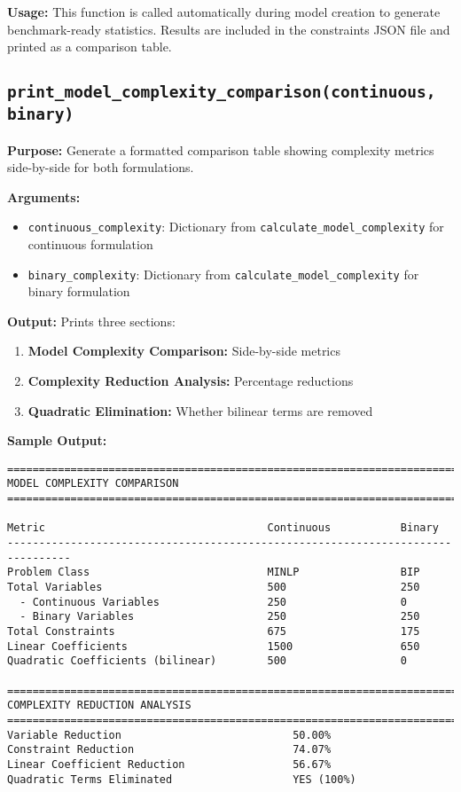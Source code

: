 \documentclass{article}
\begin{document}
\textbf{Usage:} This function is called automatically during model creation to generate benchmark-ready statistics. Results are included in the constraints JSON file and printed as a comparison table.

\subsection{\texttt{print\_model\_complexity\_comparison(continuous, binary)}}

\textbf{Purpose:} Generate a formatted comparison table showing complexity metrics side-by-side for both formulations.

\textbf{Arguments:}
\begin{itemize}
    \item \texttt{continuous\_complexity}: Dictionary from \texttt{calculate\_model\_complexity} for continuous formulation
    \item \texttt{binary\_complexity}: Dictionary from \texttt{calculate\_model\_complexity} for binary formulation
\end{itemize}

\textbf{Output:} Prints three sections:
\begin{enumerate}
    \item \textbf{Model Complexity Comparison:} Side-by-side metrics
    \item \textbf{Complexity Reduction Analysis:} Percentage reductions
    \item \textbf{Quadratic Elimination:} Whether bilinear terms are removed
\end{enumerate}

\textbf{Sample Output:}
\begin{verbatim}
================================================================================
MODEL COMPLEXITY COMPARISON
================================================================================

Metric                                   Continuous           Binary              
--------------------------------------------------------------------------------
Problem Class                            MINLP                BIP                 
Total Variables                          500                  250                 
  - Continuous Variables                 250                  0                   
  - Binary Variables                     250                  250                 
Total Constraints                        675                  175                 
Linear Coefficients                      1500                 650                 
Quadratic Coefficients (bilinear)        500                  0                   

================================================================================
COMPLEXITY REDUCTION ANALYSIS
================================================================================
Variable Reduction                           50.00%
Constraint Reduction                         74.07%
Linear Coefficient Reduction                 56.67%
Quadratic Terms Eliminated                   YES (100%)
\end{verbatim}
\end{document}
